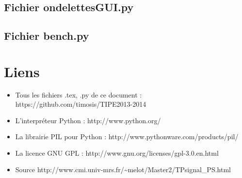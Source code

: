 \documentclass{article}
\begin{document}
\subsection{Fichier ondelettesGUI.py}


\subsection{Fichier bench.py}



\section{Liens}

\begin{itemize}
\item Tous les fichiers .tex, .py de ce document : https://github.com/timosis/TIPE2013-2014

\item L'interpréteur Python : http://www.python.org/

\item La librairie PIL pour Python : http://www.pythonware.com/products/pil/

\item La licence GNU GPL : http://www.gnu.org/licenses/gpl-3.0.en.html


\item Source http://www.cmi.univ-mrs.fr/\textasciitilde{}melot/Master2/TPsignal\_PS.html
\end{itemize}
\end{document}
